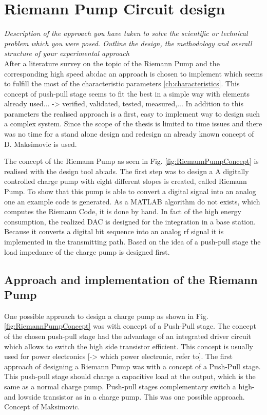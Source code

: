 \chapter{Riemann Pump Circuit design}
\label{ch:design}
\textit{Description of the approach you have taken to solve the scientific or technical problem which you were posed. Outline the design, the methodology and overall structure of your experimental approach}\\ 
After a literature survey on the topic of the Riemann Pump and the corresponding high speed \gls{ab:dac} an approach is chosen to implement which seems to fulfill the most of the characteristic parameters \ref{ch:characteristics}.
This concept of push-pull stage seems to fit the best in a simple way with elements already used... -> verified, validated, tested, measured,...
In addition to this parameters the realised approach is a first, easy to implement way to design such a complex system.
Since the scope of the thesis is limited to time issues and there was no time for a stand alone design and redesign an already known concept of D. Maksimovic \cite{MaksimovicPaper} is used.

The concept of the Riemann Pump as seen in Fig. \ref{fig:RiemannPumpConcept} is realised with the design tool \gls{ab:ads}.
The first step was to design a 
A digitally controlled charge pump with eight different slopes is created, called Riemann Pump. To show that this pump is able to convert a digital signal into an analog one an example code is generated. As a MATLAB algorithm do not exists, which computes the Riemann Code, it is done by hand.
In fact of the high energy consumption, the realized DAC is designed for the integration in a base station. Because it converts a digital bit sequence into an analog rf signal it is implemented in the transmitting path. Based on the idea of a push-pull stage the load impedance of the charge pump is designed first.
\section{Approach and implementation of the Riemann Pump}
One possible approach to design a charge pump as shown in Fig. \ref{fig:RiemannPumpConcept} was with concept of a Push-Pull stage.
The concept of the chosen push-pull stage had the advantage of an integrated driver circuit which allows to switch the high side transistor efficient.
This concept is usually used for power electronics [-> which power electronic, refer to].
The first approach of designing a Riemann Pump was with a concept of a Push-Pull stage. This push-pull stage should charge a capacitive load at the output, which is the same as a normal charge pump. Push-pull stages complementary switch a high- and lowside transistor as in a charge pump. This was one possible approach. Concept of Maksimovic.

